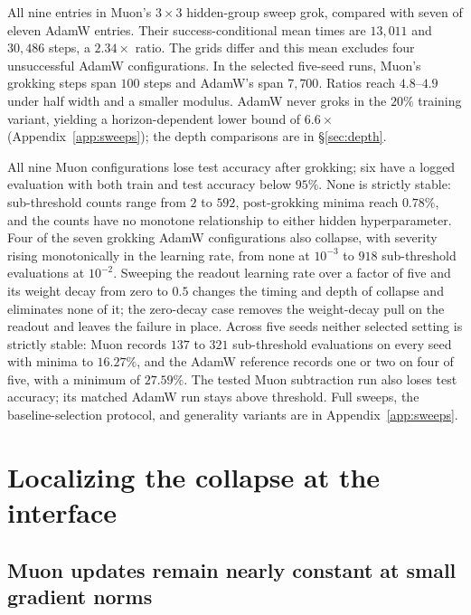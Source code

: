\documentclass{article}
\begin{document}
All nine entries in Muon's $3\times3$ hidden-group sweep grok, compared with seven of eleven AdamW entries. Their success-conditional mean times are $13{,}011$ and $30{,}486$ steps, a $2.34\times$ ratio. The grids differ and this mean excludes four unsuccessful AdamW configurations. In the selected five-seed runs, Muon's grokking steps span $100$ steps and AdamW's span $7{,}700$. Ratios reach $4.8$--$4.9$ under half width and a smaller modulus. AdamW never groks in the $20\%$ training variant, yielding a horizon-dependent lower bound of $6.6\times$ (Appendix~\ref{app:sweeps}); the depth comparisons are in \S\ref{sec:depth}.

All nine Muon configurations lose test accuracy after grokking; six have a logged evaluation with both train and test accuracy below $95\%$. None is strictly stable: sub-threshold counts range from $2$ to $592$, post-grokking minima reach $0.78\%$, and the counts have no monotone relationship to either hidden hyperparameter. Four of the seven grokking AdamW configurations also collapse, with severity rising monotonically in the learning rate, from none at $10^{-3}$ to $918$ sub-threshold evaluations at $10^{-2}$. Sweeping the readout learning rate over a factor of five and its weight decay from zero to $0.5$ changes the timing and depth of collapse and eliminates none of it; the zero-decay case removes the weight-decay pull on the readout and leaves the failure in place. Across five seeds neither selected setting is strictly stable: Muon records $137$ to $321$ sub-threshold evaluations on every seed with minima to $16.27\%$, and the AdamW reference records one or two on four of five, with a minimum of $27.59\%$. The tested Muon subtraction run also loses test accuracy; its matched AdamW run stays above threshold. Full sweeps, the baseline-selection protocol, and generality variants are in Appendix~\ref{app:sweeps}.

\section{Localizing the collapse at the interface}
\label{sec:localize}



\subsection{Muon updates remain nearly constant at small gradient norms}
\label{sec:quiet}
\end{document}
